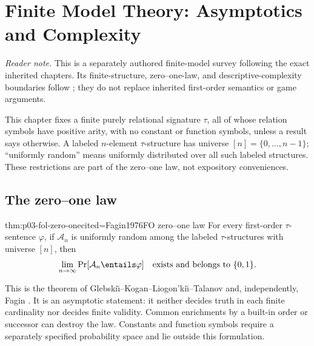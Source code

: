 
\chapter[Finite Model Theory]{Finite Model Theory: Asymptotics and Complexity}
\label{sec:p03-finite-model-theory}

\noindent\textit{Reader note.}  This is a separately authored finite-model
survey following the exact inherited chapters.  Its finite-structure,
zero--one-law, and descriptive-complexity boundaries follow
\cite{EbbinghausFlum1995,Libkin2004}; they do not replace inherited first-order
semantics or game arguments.

This chapter fixes a finite purely relational signature \(\tau\), all of whose
relation symbols have positive arity, with no constant or function symbols,
unless a result says otherwise.  A labeled
\(n\)-element \(\tau\)-structure has universe
\([n]=\{0,\ldots,n-1\}\); ``uniformly random'' means uniformly distributed
over all such labeled structures.  These restrictions are part of the
zero--one law, not expository conveniences.

\section{The zero--one law}
\label{sec:p03-zero-one-law}

\begin{hbtheorem}{thm:p03-fol-zero-one}{cited=Fagin1976}{FO zero--one law}
For every first-order \(\tau\)-sentence \(\varphi\), if \(\mathcal A_n\) is
uniformly random among the labeled \(\tau\)-structures with universe \([n]\),
then
\[
  \lim_{n\to\infty}\Pr[\mathcal A_n\entails\varphi]
  \quad\text{exists and belongs to }\{0,1\}.
\]
\end{hbtheorem}

This is the theorem of Glebski\u\i--Kogan--Liogon'ki\u\i--Talanov and,
independently, Fagin \cite{GlebskiiEtAl1969,Fagin1976,Libkin2004}.  It is an
asymptotic statement: it neither decides truth in each finite cardinality nor
decides finite validity.  Common enrichments by a built-in order or successor
can destroy the law.  Constants and function symbols require a separately
specified probability space and lie outside this formulation.

